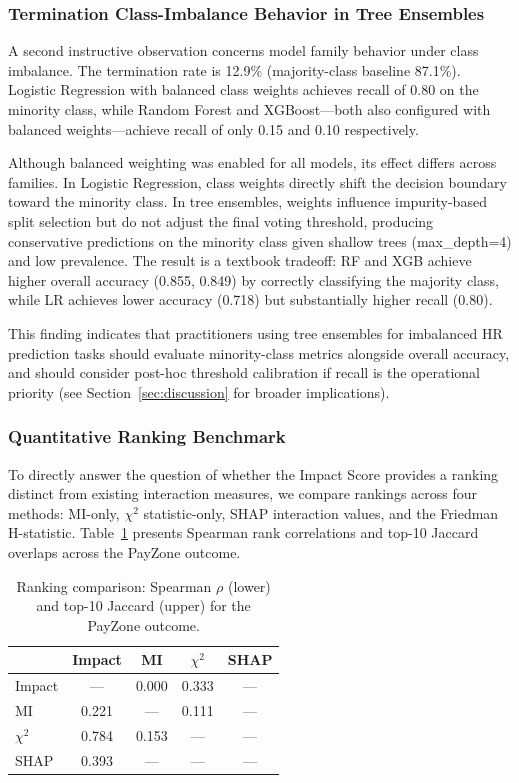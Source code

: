 \documentclass[conference]{IEEEtran}
\begin{document}
\subsubsection{Termination Class-Imbalance Behavior in Tree Ensembles}

A second instructive observation concerns model family behavior under class imbalance. The termination rate is 12.9\% (majority-class baseline 87.1\%). Logistic Regression with balanced class weights achieves recall of 0.80 on the minority class, while Random Forest and XGBoost---both also configured with balanced weights---achieve recall of only 0.15 and 0.10 respectively.

Although balanced weighting was enabled for all models, its effect differs across families. In Logistic Regression, class weights directly shift the decision boundary toward the minority class. In tree ensembles, weights influence impurity-based split selection but do not adjust the final voting threshold, producing conservative predictions on the minority class given shallow trees (max\_depth=4) and low prevalence. The result is a textbook tradeoff: RF and XGB achieve higher overall accuracy (0.855, 0.849) by correctly classifying the majority class, while LR achieves lower accuracy (0.718) but substantially higher recall (0.80).

This finding indicates that practitioners using tree ensembles for imbalanced HR prediction tasks should evaluate minority-class metrics alongside overall accuracy, and should consider post-hoc threshold calibration if recall is the operational priority (see Section~\ref{sec:discussion} for broader implications).

\subsubsection{Quantitative Ranking Benchmark}

To directly answer the question of whether the Impact Score provides a ranking distinct from existing interaction measures, we compare rankings across four methods: MI-only, $\chi^2$ statistic-only, SHAP interaction values, and the Friedman H-statistic. Table~\ref{tab:ranking_benchmark} presents Spearman rank correlations and top-10 Jaccard overlaps across the PayZone outcome.

\begin{table}[htb]
\centering
\small
\renewcommand{\arraystretch}{1.15}
\caption{Ranking comparison: Spearman $\rho$ (lower) and top-10 Jaccard (upper) for the PayZone outcome.}
\label{tab:ranking_benchmark}
\begin{tabular}{lcccc}
\hline
 & Impact & MI & $\chi^2$ & SHAP \\
\hline
Impact & --- & 0.000 & 0.333 & --- \\
MI & 0.221 & --- & 0.111 & --- \\
$\chi^2$ & 0.784 & 0.153 & --- & --- \\
SHAP & 0.393 & --- & --- & --- \\
\hline
\end{tabular}
\end{table}
\end{document}
